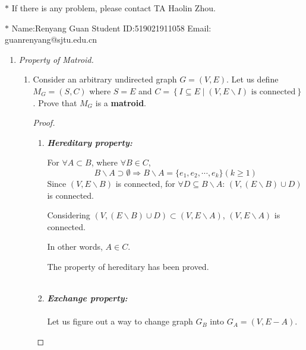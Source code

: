 \documentclass[12pt,a4paper]{article}
\theoremstyle{definition}
\begin{document}
\noindent

\noindent{}
\begin{center}
\footnotesize{\color{red}$*$ If there is any problem, please contact TA Haolin Zhou.}

\footnotesize{\color{blue}$*$ Name:Renyang Guan  \quad Student ID:519021911058 \quad Email: guanrenyang@sjtu.edu.cn}
\end{center}

\begin{enumerate}
\item \textit{Property of Matroid.} 
\begin{enumerate}
	\item
	Consider an arbitrary undirected graph $ G=(V,E) $. Let us define $ M_{G}=(S,C) $ where $ S=E $ and $ C=\left\{I \subseteq E \mid\left(V, E \backslash I\right) \text { is connected}\right\} $. Prove that $ M_{G} $ is a \textbf{matroid}.\par
	    \begin{proof}
	    ~\\
	    \begin{enumerate}
	    \item
	    \textbf{\textit{Hereditary property:}}
	    
		For $\forall A \subset B$, where $\forall B \in C$, 
		$$B\backslash A\supset \emptyset \Rightarrow B\backslash A=\{e_1,e_2,\cdots,e_k\}(k\geq 1)$$
		Since $(V,E\backslash B)$ is connected, for $\forall D \subseteq B\backslash A$: $(V,(E\backslash B)\cup D)$ is connected.
		
		Considering $(V,(E\backslash B)\cup D)\subset (V,E\backslash A)$, $(V,E\backslash A)$ is connected. 
		
		In other words, $A\in C$.
		
		The property of hereditary has been proved.
	    \\
	    \\
	    \item
	    \textbf{\textit{Exchange property:}}
\\
\\
	    Let us figure out a way to change graph $G_B$ into $G_A=(V,E-A)$.
	    

\end{enumerate}
\end{proof}
\end{enumerate}
\end{enumerate}
\end{document}
